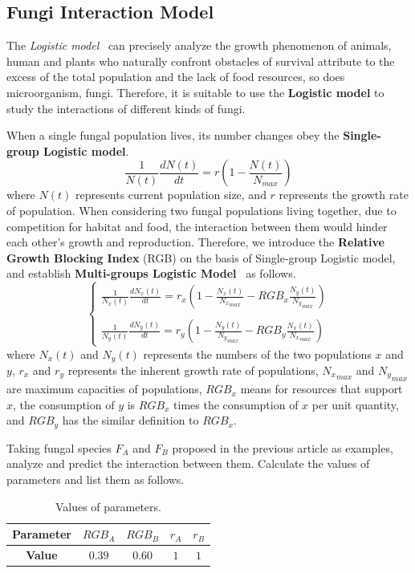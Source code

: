 \subsection{Fungi Interaction Model}
The \textit{Logistic model}~\cite{logisticmodel} can precisely analyze the growth phenomenon of animals, human and plants who naturally confront obstacles of survival attribute to the excess of the total population and the lack of food resources, so does microorganism, fungi. Therefore, it is suitable to use the \textbf{Logistic model} to study the interactions of different kinds of fungi.
\par
When a single fungal population lives, its number changes obey the \textbf{Single-group Logistic model}.
\begin{equation}
  \label{12eq}
  \frac{1}{N(t)}\frac{dN(t)}{dt} = r(1-\frac{N(t)}{N_{max}})
\end{equation}
where $N(t)$ represents current population size, and $r$ represents the growth rate of population.
When considering two fungal populations living together, due to competition for habitat and food, the interaction between them would hinder each other's growth and reproduction. Therefore, we introduce the \textbf{Relative Growth Blocking Index} (RGB) on the basis of Single-group Logistic model, and establish \textbf{Multi-groups Logistic Model}~\cite{multigroups} as follows.
\begin{equation}
  \begin{cases}
    \frac{1}{N_x(t)}\frac{dN_x(t)}{dt} = r_x(1-\frac{N_x(t)}{{N_x}_{max}} - RGB_x\frac{N_y(t)}{{N_y}_{max}}) \\ \\
    \frac{1}{N_y(t)}\frac{dN_y(t)}{dt} = r_y(1-\frac{N_y(t)}{{N_y}_{max}} - RGB_y\frac{N_x(t)}{{N_x}_{max}})
  \end{cases}
\end{equation}
where $N_x(t)$ and $N_y(t)$ represents the numbers of the two populations $x$ and $y$, $r_x$ and $r_y$ represents the inherent growth rate of populations, ${N_x}_{max}$ and ${N_y}_{max}$ are maximum capacities of populations, $RGB_x$ means for resources that support $x$, the consumption of $y$ is $RGB_x$ times the consumption of $x$ per unit quantity, and $RGB_y$ has the similar definition to $RGB_x$.
\par
Taking fungal species $F_A$ and $F_B$ proposed in the previous article as examples, analyze and predict the interaction between them. Calculate the values of parameters and list them as follows.
\begin{table}[H]
  \centering
  \caption{Values of parameters.}
  \label{valueofparameters}
  \begin{tabular*}{\hsize}{@{\extracolsep{\fill}}ccccc}
    \toprule
    \textbf{Parameter} & $RGB_A$ & $RGB_B$ & $r_A$ & $r_B$ \\
    \midrule
    \textbf{Value} & $0.39$ & $0.60$ & $1$ & $1$ \\
    \bottomrule
  \end{tabular*}
\end{table}

